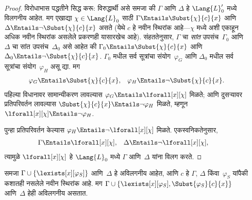 \begin{proof}
विरोधाभास पद्धतीने सिद्ध करू: विरुद्धार्थी असे समजा की $\Gamma$ आणि
$\Delta$ हे $\Lang{L}'_0$ मध्ये विलगनीय आहेत. मग एखाद्या $\chi \in
\Lang{L}_0$ साठी $\Gamma \Entails \Subst{\chi}{c}{x}$ आणि $\Delta
\Entails \lnot \Subst{\chi}{c}{x}$ असते (येथे $c$ हे नवीन स्थिरांक
आहे---$\chi$ मध्ये अशी एकाहून अधिक नवीन स्थिरांक असलेले प्रकरणही यासारखेच
आहे). संहततेनुसार, $\Gamma$ चा \emph{सांत} उपसंच~$\Gamma_0$ आणि
$\Delta$ चा सांत उपसंच~$\Delta_0$ असे आहेत की $\Gamma_0 \Entails
\Subst{\chi}{c}{x}$ आणि $\Delta_0 \Entails \lnot \Subst{\chi}{c}{x}$.
$\Gamma_0$ मधील सर्व सूत्रांचा संयोग~$\varphi_{G}$ आणि $\Delta_0$ मधील सर्व
सूत्रांचा संयोग~$\varphi_{H}$ असू द्या. मग
\begin{align*}
  \varphi_{G} & \Entails \Subst{\chi}{c}{x}, & \varphi_{H}  \Entails \lnot \Subst{\chi}{c}{x}.
\end{align*}
पहिल्या विधानावर सामान्यीकरण लावल्यास $\varphi_{G} \Entails \lforall[x][\chi]$
मिळते; आणि दुसऱ्यावर प्रतिपरिवर्तन लावल्यास $\Subst{\chi}{c}{x}
\Entails \lnot \varphi_{H}$ मिळते, म्हणून $\lforall[x][\chi] \Entails \lnot \varphi_{H}$.

पुन्हा प्रतिपरिवर्तन केल्यास $\varphi_{H} \Entails \lnot \lforall[x][\chi]$
मिळते. एकस्वनिकतेनुसार,
\begin{align*}
  \Gamma &\Entails \lforall[x][\chi], &
  \Delta & \Entails \lnot \lforall[x][\chi],
\end{align*}
त्यामुळे $\lforall[x][\chi]$ हे $\Lang{L}_0$ मध्ये $\Gamma$ आणि~$\Delta$
यांना विलग करते.
\end{proof}

\begin{lem}\label{mod:int:sep:lem:sep2}
समजा $\Gamma \cup \{ \lexists[x][\varphi_{S}] \}$ आणि~$\Delta$ हे अविलगनीय
आहेत, आणि $c$ हे $\Gamma$, $\Delta$ किंवा~$\varphi_{S}$ यांपैकी कशातही नसलेले नवीन
स्थिरांक आहे. मग $\Gamma \cup \{ \lexists[x][\varphi_{S}],
\Subst{\varphi_{S}}{c}{x} \}$ आणि~$\Delta$ हेही अविलगनीय असतात.
\end{lem}

